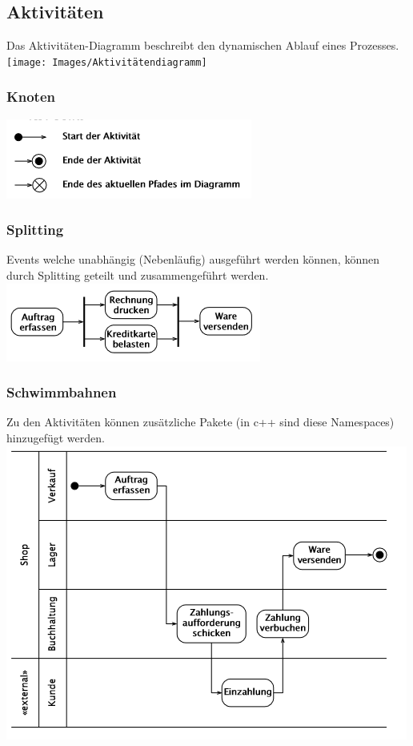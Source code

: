 \subsection{Aktivitäten}
Das Aktivitäten-Diagramm beschreibt den dynamischen Ablauf eines Prozesses.\\
\texttt{[image: Images/Aktivitätendiagramm]}


\subsubsection{Knoten}
\includegraphics[width=0.6\columnwidth]{Images/knoten}

\subsubsection{Splitting}
Events welche unabhängig (Nebenläufig) ausgeführt werden können, können durch Splitting geteilt und zusammengeführt werden.\\
\includegraphics[width=0.6\columnwidth]{Images/splitting}


\subsubsection{Schwimmbahnen}
Zu den Aktivitäten können zusätzliche Pakete (in c++ sind diese Namespaces) hinzugefügt werden.\\
\includegraphics[width=\columnwidth]{Images/schwimmbahnen}

